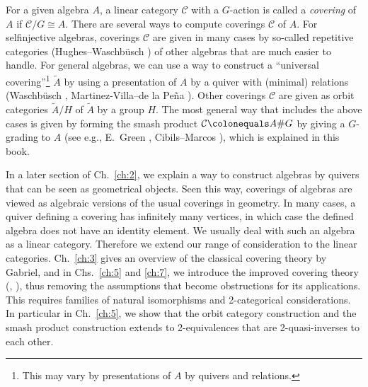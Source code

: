 \documentclass{surv-l}
\numberwithin{equation}{chapter}
\numberwithin{figure}{chapter}
\theoremstyle{plain}
\theoremstyle{definition}
\theoremstyle{remark}
\begin{document}
For a given algebra $A$, a linear category ${\mathcal{C}}$ with a $G$-action
is called a {\em covering} of $A$ if ${\mathcal{C}}/G \cong A$.
There are several ways to compute coverings ${\mathcal{C}}$ of $A$.
For selfinjective algebras, coverings ${\mathcal{C}}$ are given in many cases
by so-called repetitive categories
(Hughes--Waschb\"{u}sch \cite{HW}) of other algebras that are much easier to handle.
For general algebras, we can use a way to construct a ``universal covering''\footnote{This may vary by presentations of $A$ by quivers and relations.}
$\tilde{A}$
by using a presentation of $A$ by a quiver with (minimal) relations
(Waschb\"{u}sch \cite{Wa81}, Martinez-Villa--de la Pe\~{n}a \cite{M-P83}).
Other coverings ${\mathcal{C}}$ are given as orbit categories $\tilde{A}/H$
of $\tilde{A}$ by a group $H$.
The most general way that includes the above cases is given by
forming the smash product
${\mathcal{C}}\colonequals A \# G$ by giving a $G$-grading to $A$
(see e.g., E.~Green \cite{Gr}, Cibils--Marcos \cite{C-M}),
which is explained in this book.

In a later section of Ch.\ \ref{ch:2}, we explain a way to construct algebras by quivers
that can be seen as geometrical objects.
Seen this way, coverings of algebras are viewed
as algebraic versions of the usual coverings in geometry.
In many cases, a quiver defining a covering has infinitely many vertices,
in which case the defined algebra does not have an identity element.
We usually deal with such an algebra as a linear category.
Therefore we extend our range of consideration to the linear categories.
Ch.\ \ref{ch:3} gives an overview of the classical covering theory by Gabriel,
and in Chs.~\ref{ch:5} and \ref{ch:7}, we introduce the improved
covering theory (\cite{Asa11}, \cite{Asa12}),
thus removing the assumptions that become obstructions for its applications.
This requires families of natural isomorphisms and 2-categorical considerations.
In particular in Ch.\ \ref{ch:5}, we show that the orbit category construction and
the smash product construction extends to 2-equivalences
that are 2-quasi-inverses to each other.
\end{document}
